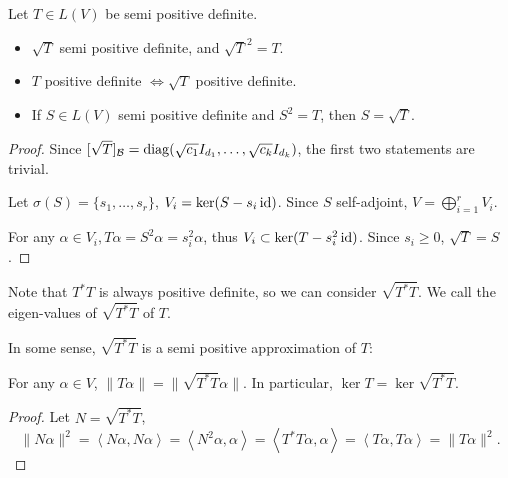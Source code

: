 \begin{theorem}
    Let $T\in L(V)$ be semi positive definite.
	\begin{itemize}
		\item $\sqrt{T}$ semi positive definite, and $\sqrt{T}^2 = T$.
		\item $T$ positive definite $\iff \sqrt{T}$ positive definite.
		\item If $S\in L(V)$ semi positive definite and $S^2 = T$,
			then $S = \sqrt{T}$.
	\end{itemize}
\end{theorem}
\begin{proof}[Proof]
	Since $[\sqrt{T}]_{\mathcal{B}}=\operatorname{diag}(\sqrt{c_1}I_{d_1},\dots,\sqrt{c_k}I_{d_k})$,
	the first two statements are trivial.

	Let $\sigma(S) = \{s_1, \dots, s_r\}$, $V_i = \ker(S - s_i\operatorname{id})$.
	Since $S$ self-adjoint, $V = \bigoplus_{i=1}^r V_i$.

	For any $\alpha \in V_i, T\alpha = S^2\alpha = s_i^2\alpha$,
	thus $V_i \subset \ker(T - s_i^2\operatorname{id})$.
	Since $s_i \ge 0$, $\sqrt{T} = S$.
\end{proof}

Note that $T^*T$ is always positive definite,
so we can consider $\sqrt{T^*T}$.
We call the eigen-values of $\sqrt{T^*T}$  of $T$.

In some sense, $\sqrt{T^*T}$ is a semi positive approximation of $T$:
\begin{lemma}
	For any $\alpha\in V$, $\lVert T\alpha \rVert = \lVert \sqrt{T^*T}\alpha \rVert$.
	In particular, $\ker T = \ker \sqrt{T^*T}$.
\end{lemma}
\begin{proof}[Proof]
    Let $N = \sqrt{T^*T}$,
	\[
	\lVert N\alpha \rVert ^2 = \left<N\alpha, N\alpha \right>
	= \left<N^2\alpha, \alpha \right> = \left<T^*T\alpha, \alpha \right>
	= \left<T\alpha, T\alpha \right> = \lVert T\alpha \rVert ^2.
	\]
\end{proof}

